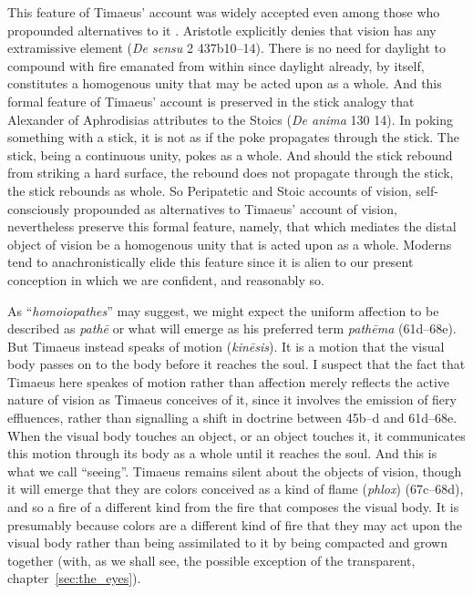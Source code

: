 This feature of Timaeus' account was widely accepted even among those who propounded alternatives to it \cite[chapter 1]{Lindberg:1977aa}. Aristotle explicitly denies that vision has any extramissive element (\emph{De sensu} 2 437b10--14). There is no need for daylight to compound with fire emanated from within since daylight already, by itself, constitutes a homogenous unity that may be acted upon as a whole. And this formal feature of Timaeus' account is preserved in the stick analogy that Alexander of Aphrodisias attributes to the Stoics (\emph{De anima} 130 14). In poking something with a stick, it is not as if the poke propagates through the stick. The stick, being a continuous unity, pokes as a whole. And should the stick rebound from striking a hard surface, the rebound does not propagate through the stick, the stick rebounds as whole. So Peripatetic and Stoic accounts of vision, self-consciously propounded as alternatives to Timaeus' account of vision, nevertheless preserve this formal feature, namely, that which mediates the distal object of vision be a homogenous unity that is acted upon as a whole. Moderns tend to anachronistically elide this feature since it is alien to our present conception in which we are confident, and reasonably so.

As ``\emph{homoiopathes}'' may suggest, we might expect the uniform affection to be described as \emph{pathē} or what will emerge as his preferred term \emph{pathēma} (61d--68e). But Timae\-us instead speaks of motion (\emph{kinēsis}). It is a motion that the visual body passes on to the body before it reaches the soul. I suspect that the fact that Timaeus here speakes of motion rather than affection merely reflects the active nature of vision as Timaeus conceives of it, since it involves the emission of fiery effluences, rather than signalling a shift in doctrine between 45b--d and 61d--68e. When the visual body touches an object, or an object touches it, it communicates this motion through its body as a whole until it reaches the soul. And this is what we call ``seeing''. Timaeus remains silent about the objects of vision, though it will emerge that they are colors conceived as a kind of flame (\emph{phlox}) (67c–68d), and so a fire of a different kind from the fire that composes the visual body. It is presumably because colors are a different kind of fire that they may act upon the visual body rather than being assimilated to it by being compacted and grown together (with, as we shall see, the possible exception of the transparent, chapter~\ref{sec:the_eyes}).

